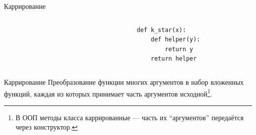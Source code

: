 \begin{frame}[fragile]{Каррирование}
\begin{columns}[onlytextwidth]
\begin{column}[t]{0.485\textwidth}
            \end{column}\hfill
            \begin{column}[t]{0.485\textwidth}
                \begin{verbatim}
                    def k_star(x):
                        def helper(y):
                            return y
                        return helper
                \end{verbatim}
            \end{column}
        \end{columns}
        \pause
        \vspace{-0.5em}
        \begin{block}{Каррирование}
            Преобразование функции многих аргументов в набор вложенных функций, каждая из которых принимает часть аргументов исходной\footnote{В ООП методы класса каррированные --- часть их ``аргументов'' передаётся через конструктор.}.
        \end{block}
    \end{frame}

